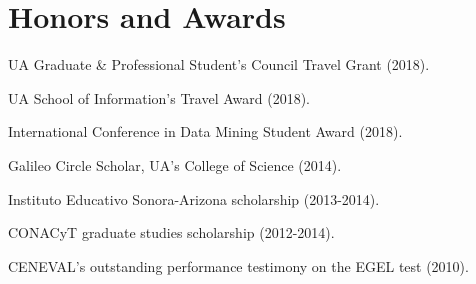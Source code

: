 \documentclass[letterpaper]{article}
\renewenvironment{itemize}{
  \begin{list}{}{
    \setlength{\leftmargin}{1.5em}
  }
}{
  \end{list}
}
\begin{document}

\section*{Honors and Awards}
\begin{itemize}
	\item UA Graduate \& Professional Student's Council Travel Grant (2018).
	\item UA School of Information's Travel Award (2018).
	\item International Conference in Data Mining Student Award (2018).
	\item Galileo Circle Scholar, UA's College of Science (2014).
	\item Instituto Educativo Sonora-Arizona scholarship (2013-2014).
	\item CONACyT graduate studies scholarship (2012-2014).
	\item CENEVAL's outstanding performance testimony on the EGEL test (2010). 
\end{itemize}
\end{document}
